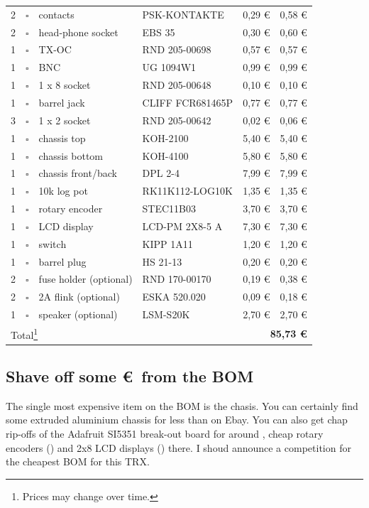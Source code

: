 \documentclass[10pt, a4paper,twoside]{scrartcl}
\begin{document}
\begin{longtable}{|p{}|p{}|p{}|p{}|p{}|p{}|}
2 & $\square$ & contacts & PSK-KONTAKTE & 0,29 \euro & 0,58 \euro \\
2 & $\square$ & head-phone socket & EBS 35 & 0,30 \euro & 0,60 \euro\\
1 & $\square$ & TX-OC & RND 205-00698 & 0,57 \euro & 0,57 \euro \\
1 & $\square$ & BNC & UG 1094W1 & 0,99 \euro & 0,99 \euro \\
1 & $\square$ & 1 x 8 socket & RND 205-00648 & 0,10 \euro & 0,10 \euro \\
1 & $\square$ & barrel jack & CLIFF FCR681465P & 0,77 \euro & 0,77 \euro \\
3 & $\square$ & 1 x 2 socket & RND 205-00642 & 0,02 \euro & 0,06 \euro \\ \hline
1 & $\square$ & chassis top & KOH-2100 & 5,40 \euro & 5,40 \euro \\
1 & $\square$ & chassis bottom & KOH-4100 & 5,80 \euro & 5,80 \euro \\
1 & $\square$ & chassis front/back & DPL 2-4 & 7,99 \euro & 7,99 \euro \\
1 & $\square$ & 10k log pot & RK11K112-LOG10K & 1,35 \euro & 1,35 \euro \\
1 & $\square$ & rotary encoder & STEC11B03 & 3,70 \euro & 3,70 \euro \\
1 & $\square$ & LCD display & LCD-PM 2X8-5 A & 7,30 \euro & 7,30 \euro \\
1 & $\square$ & switch & KIPP 1A11 & 1,20 \euro & 1,20 \euro \\
1 & $\square$ & barrel plug & HS 21-13 & 0,20 \euro & 0,20 \euro \\
2 & $\square$ & fuse holder (optional) & RND 170-00170 & 0,19 \euro & 0,38 \euro \\
2 & $\square$ & 2A flink (optional) & ESKA 520.020 & 0,09 \euro & 0,18 \euro \\
1 & $\square$ & speaker (optional) & LSM-S20K & 2,70 \euro & 2,70 \euro \\ \hline \hline
\multicolumn{4}{|l}{Total\footnote{Prices may change over time.}} & \multicolumn{2}{r|}{\textbf{85,73 \euro}} \\ \hline
\end{longtable}

\subsection{Shave off some \euro\ from the BOM}
The single most expensive item on the BOM is the chasis. You can certainly find some extruded aluminium chassis for less than  on Ebay. You can also get chap rip-offs of the Adafruit SI5351 break-out board for around , cheap rotary encoders () and 2x8 LCD displays () there. I shoud announce a competition for the cheapest BOM for this TRX.
\end{document}

